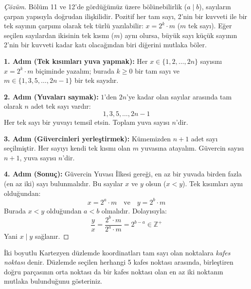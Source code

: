 \begin{proof}[Çözüm]
Bölüm 11 ve 12'de gördüğümüz üzere bölünebilirlik ($a \mid b$), sayıların çarpan yapısıyla doğrudan ilişkilidir. Pozitif her tam sayı, 2'nin bir kuvveti ile bir tek sayının çarpımı olarak tek türlü yazılabilir: $x = 2^k \cdot m$ ($m$ tek sayı). Eğer seçilen sayılardan ikisinin tek kısmı ($m$) aynı olursa, büyük sayı küçük sayının 2'nin bir kuvveti kadar katı olacağından biri diğerini mutlaka böler.

\textbf{1. Adım (Tek kısımları yuva yapmak):}
Her $x \in \{1, 2, \dots, 2n\}$ sayısını $x = 2^k \cdot m$ biçiminde yazalım; burada $k \ge 0$ bir tam sayı ve $m \in \{1, 3, 5, \dots, 2n-1\}$ bir tek sayıdır.

\textbf{2. Adım (Yuvaları saymak):}
$1$'den $2n$'ye kadar olan sayılar arasında tam olarak $n$ adet tek sayı vardır:
\[
1, 3, 5, \dots, 2n-1
\]
Her tek sayı bir yuvayı temsil etsin. Toplam yuva sayısı $n$'dir.

\textbf{3. Adım (Güvercinleri yerleştirmek):}
Kümemizden $n+1$ adet sayı seçilmiştir. Her sayıyı kendi tek kısmı olan $m$ yuvasına atayalım.
Güvercin sayısı $n+1$, yuva sayısı $n$'dir.

\textbf{4. Adım (Sonuç):}
Güvercin Yuvası İlkesi gereği, en az bir yuvada birden fazla (en az iki) sayı bulunmalıdır.
Bu sayılar $x$ ve $y$ olsun ($x < y$).
Tek kısımları aynı olduğundan:
\[
x = 2^a \cdot m \quad \text{ve} \quad y = 2^b \cdot m
\]
Burada $x < y$ olduğundan $a < b$ olmalıdır. Dolayısıyla:
\[
\frac{y}{x} = \frac{2^b \cdot m}{2^a \cdot m} = 2^{b-a} \in \mathbb{Z}^+
\]
Yani $x \mid y$ sağlanır.
\end{proof}

\begin{example}
İki boyutlu Kartezyen düzlemde koordinatları tam sayı olan noktalara \emph{kafes noktası} denir. Düzlemde seçilen herhangi 5 kafes noktası arasında, birleştiren doğru parçasının orta noktası da bir kafes noktası olan en az iki noktanın mutlaka bulunduğunu gösteriniz.
\end{example}

